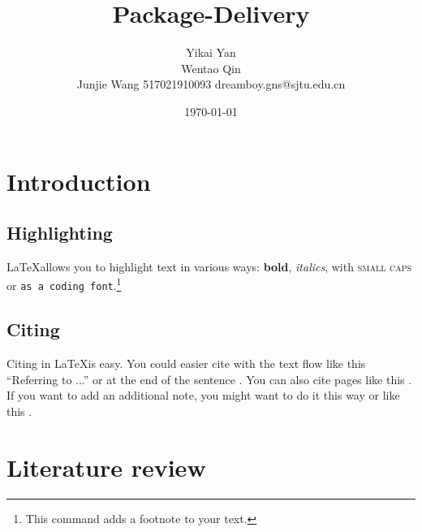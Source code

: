 \documentclass[11pt, a4paper]{article} %
\title{Package-Delivery} %
\author{ 
Yikai Yan \\
Wentao Qin \\
Junjie Wang 517021910093 dreamboy.gns@sjtu.edu.cn %
  }
\date{\small \today} %
\begin{document}
%

\maketitle %



\setcounter{page}{1} %

\section{Introduction} %
\subsection{Highlighting} %
\LaTeX allows you to highlight text in various ways: \textbf{bold}, \textit{italics}, with \textsc{small caps} or \texttt{as a coding font}.\footnote{ This command adds a footnote to your text.} 

\subsection{Citing} %
Citing in \LaTeX is easy. You could easier cite with the text flow like this ``Referring to \citet{collier2004greed} ...''  or at the end of the sentence \cite{collier2004greed}. You can also cite pages like this \citep[55]{collier2004greed}. If you want to add an additional note, you might want to do it this way \citep[cp.][22]{collier2004greed} or like this \citep[cp.][]{collier2004greed}.\\
\blindtext %


\section{Literature review}
\end{document}
